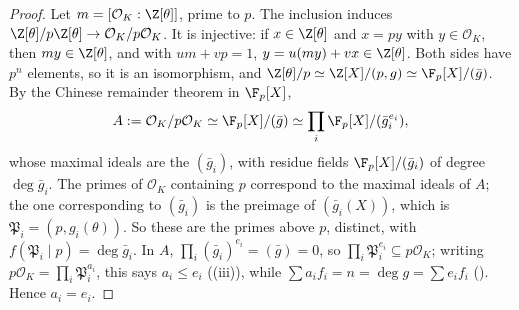 \begin{proof}
Let $m=[\mathcal O_K:\Z[\theta]]$, prime to $p$. The inclusion induces $\Z[\theta]/p\Z[\theta]\to\mathcal O_K/p\mathcal O_K$. It is injective: if
$x\in\Z[\theta]$ and $x=py$ with $y\in\mathcal O_K$, then $my\in\Z[\theta]$, and with $um+vp=1$, $y=u(my)+vx\in\Z[\theta]$. Both sides have $p^n$
elements, so it is an isomorphism, and $\Z[\theta]/p\simeq\Z[X]/(p,g)\simeq\F_p[X]/(\bar g)$. By the Chinese remainder theorem in $\F_p[X]$,
\[
A:=\mathcal O_K/p\mathcal O_K\simeq\F_p[X]/(\bar g)\simeq\prod_i\F_p[X]/(\bar g_i^{e_i}),
\]
whose maximal ideals are the $(\bar g_i)$, with residue fields $\F_p[X]/(\bar g_i)$ of degree $\deg\bar g_i$. The primes of $\mathcal O_K$ containing $p$
correspond to the maximal ideals of $A$; the one corresponding to $(\bar g_i)$ is the preimage of $(\bar g_i(X))$, which is $\mathfrak P_i=(p,g_i(\theta))$.
So these are the primes above $p$, distinct, with $f(\mathfrak P_i\mid p)=\deg\bar g_i$. In $A$, $\prod_i(\bar g_i)^{e_i}=(\bar g)=0$, so
$\prod_i\mathfrak P_i^{e_i}\subseteq p\mathcal O_K$; writing $p\mathcal O_K=\prod_i\mathfrak P_i^{a_i}$, this says $a_i\le e_i$ ((iii)),
while $\sum a_if_i=n=\deg g=\sum e_if_i$ (). Hence $a_i=e_i$.
\end{proof}

